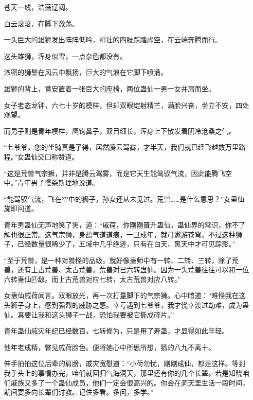 
\begin{this_body}



苍天一线，浩荡辽阔。

白云滚滚，在脚下激荡。

一头巨大的雄狮发出阵阵低吟，粗壮的四肢踩踏虚空，在云端奔腾而行。

这头雄狮，浑身似雪，一点杂色都没有。

浓密的狮鬃在风云中飘扬，巨大的气浪在它脚下喷涌。

雄狮的背上，竟安置着一张巨大的座椅，两位蛊仙一男一女并肩而坐。

女子老态龙钟，六七十岁的模样，但却双眼绽射精芒，满脸兴奋，坐立不安，四处观望。

而男子则是青年模样，鹰钩鼻子，双目细长，浑身上下散发着阴冷沧桑之气。

“七爷爷，您的坐骑真是了得，居然腾云驾雾，才半天，我们就已经飞越数万里路程。”女蛊仙交口称赞道。

“这是荒兽气宗狮，并非是腾云驾雾，而是它天生能驾驭气流，因此能腾飞空中。”青年男子慢条斯理地说道。

“能驾驭气流，飞在空中的狮子，孙女还从未见过。荒兽……是什么意思？”女蛊仙旋即问道。

青年男蛊仙无声地笑了笑，道：“戚荷，你刚刚晋升蛊仙，蛊仙界的常识，你不了解也很正常。这气宗狮，身蕴气道道痕，一旦成年，就可遨游苍穹。不过这种狮子，已经数量很稀少了，五域中几乎绝迹，只有在白天、黑天中才可见踪影。”

“至于荒兽，是一种对兽怪的品级。就好像蛊师中有一转、二转、三转，除了荒兽，还有上古荒兽、太古荒兽。荒兽对已六转蛊仙。因为一头荒兽往往可以和一位六转蛊仙匹敌。而上古荒兽对应七转，太古荒兽对应八转。”

女蛊仙戚荷闻言。双眼放光，再一次打量脚下的气宗狮。心中暗道：“难怪我在这头狮子身上，感到强烈的威胁之感。幸亏遇到七爷爷，我才侥幸渡过劫难，成为蛊仙。真要让我和这头狮子一战，恐怕我要被它撕成碎片。”

青年蛊仙戚灾年纪已经数百，七转修为，只是用了寿蛊，才显得如此年轻。

他年老成精，瞥见戚荷脸色。便将她心中所思所想，猜的八九不离十。

伸手拍拍这位后辈的肩膀，戚灾宽慰道：“小荷勿忧，刚刚成仙，都是这样。等到我手头上的事情办完，咱们就回归气海洞天，那里还有你的几个长辈。若是知晓咱们戚族又多了一个蛊仙成员，他们一定会很高兴的。你会在洞天里生活一段时间，期间要多向长辈们讨教。记住多看。多问，多学。”


\end{this_body}
